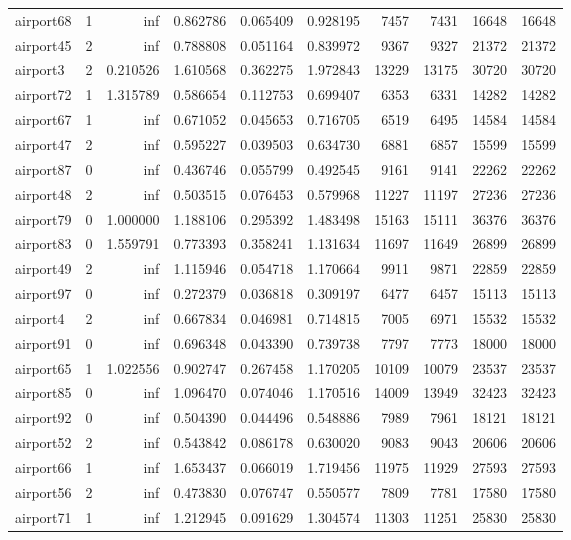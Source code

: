 \begin{longtable}{|l|r|r|r|r|r|r|r|r|r|}
airport68 & 1 & inf & 0.862786 & 0.065409 & 0.928195 & 7457 & 7431 & 16648 & 16648 \\
airport45 & 2 & inf & 0.788808 & 0.051164 & 0.839972 & 9367 & 9327 & 21372 & 21372 \\
airport3 & 2 & 0.210526 & 1.610568 & 0.362275 & 1.972843 & 13229 & 13175 & 30720 & 30720 \\
airport72 & 1 & 1.315789 & 0.586654 & 0.112753 & 0.699407 & 6353 & 6331 & 14282 & 14282 \\
airport67 & 1 & inf & 0.671052 & 0.045653 & 0.716705 & 6519 & 6495 & 14584 & 14584 \\
airport47 & 2 & inf & 0.595227 & 0.039503 & 0.634730 & 6881 & 6857 & 15599 & 15599 \\
airport87 & 0 & inf & 0.436746 & 0.055799 & 0.492545 & 9161 & 9141 & 22262 & 22262 \\
airport48 & 2 & inf & 0.503515 & 0.076453 & 0.579968 & 11227 & 11197 & 27236 & 27236 \\
airport79 & 0 & 1.000000 & 1.188106 & 0.295392 & 1.483498 & 15163 & 15111 & 36376 & 36376 \\
airport83 & 0 & 1.559791 & 0.773393 & 0.358241 & 1.131634 & 11697 & 11649 & 26899 & 26899 \\
airport49 & 2 & inf & 1.115946 & 0.054718 & 1.170664 & 9911 & 9871 & 22859 & 22859 \\
airport97 & 0 & inf & 0.272379 & 0.036818 & 0.309197 & 6477 & 6457 & 15113 & 15113 \\
airport4 & 2 & inf & 0.667834 & 0.046981 & 0.714815 & 7005 & 6971 & 15532 & 15532 \\
airport91 & 0 & inf & 0.696348 & 0.043390 & 0.739738 & 7797 & 7773 & 18000 & 18000 \\
airport65 & 1 & 1.022556 & 0.902747 & 0.267458 & 1.170205 & 10109 & 10079 & 23537 & 23537 \\
airport85 & 0 & inf & 1.096470 & 0.074046 & 1.170516 & 14009 & 13949 & 32423 & 32423 \\
airport92 & 0 & inf & 0.504390 & 0.044496 & 0.548886 & 7989 & 7961 & 18121 & 18121 \\
airport52 & 2 & inf & 0.543842 & 0.086178 & 0.630020 & 9083 & 9043 & 20606 & 20606 \\
airport66 & 1 & inf & 1.653437 & 0.066019 & 1.719456 & 11975 & 11929 & 27593 & 27593 \\
airport56 & 2 & inf & 0.473830 & 0.076747 & 0.550577 & 7809 & 7781 & 17580 & 17580 \\
airport71 & 1 & inf & 1.212945 & 0.091629 & 1.304574 & 11303 & 11251 & 25830 & 25830 \\

\end{longtable}
